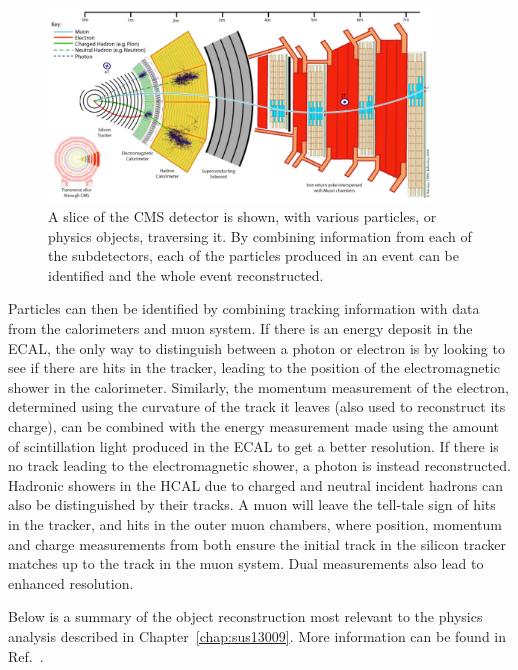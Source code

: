 \begin{figure}[htbp]
  \begin{center}
  \includegraphics[width=0.9\textwidth]{Figures/detector/CMS_Slice.pdf}
  \caption{A slice of the \ac{CMS} detector is shown, with various particles, or physics objects, traversing it. By combining information from each of the subdetectors, each of the particles produced in an event can be identified and the whole event reconstructed.
}
  \label{fig:CMSslice}
  \end{center}
\end{figure}

Particles can then be identified by combining tracking information with data from the calorimeters and muon system.
If there is an energy deposit in the \ac{ECAL}, the only way to distinguish between a photon or electron is by looking to see if there are hits in the tracker, leading to the position of the electromagnetic shower in the calorimeter. 
Similarly, the momentum measurement of the electron, determined using the curvature of the track it leaves (also used to reconstruct its charge), can be combined with the energy measurement made using the amount of scintillation light produced in the \ac{ECAL} to get a better resolution.
If there is no track leading to the electromagnetic shower, a photon is instead reconstructed.
Hadronic showers in the \ac{HCAL} due to charged and neutral incident hadrons can also be distinguished by their tracks.
A muon will leave the tell-tale sign of hits in the tracker, and hits in the outer muon chambers, where position, momentum and charge measurements from both ensure the initial track in the silicon tracker matches up to the track in the muon system. Dual measurements also lead to enhanced resolution.


Below is a summary of the object reconstruction most relevant to the physics analysis described in Chapter~\ref{chap:sus13009}. 
More information can be found in Ref.~\cite{TDRVOL1}.



